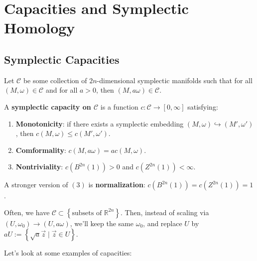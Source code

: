 \chapter{Capacities and Symplectic Homology}
\label{u2}

\section{Symplectic Capacities}

Let $\mathcal{C}$ be some collection of $2n$-dimensional symplectic manifolds such that for all $(M, \omega) \in \mathcal{C}$ and for all $a>0$, then $(M, a\omega) \in \mathcal{C}$.

\begin{definition}

A \textbf{symplectic capacity on $\mathcal{C}$} is a function $c: \mathcal{C}\to [0,\infty]$ satisfying:

\begin{enumerate}
\item \textbf{Monotonicity}: if there exists a symplectic embedding $(M, \omega) \hookrightarrow (M', \omega')$, then $c(M, \omega) \le c(M', \omega')$.
\item \textbf{Comformality}: $c(M, a\omega) = ac(M, \omega)$.
\item \textbf{Nontriviality}: $c(B^{2n}(1))>0$ and $c(Z^{2n}(1))<\infty$.
\end{enumerate}

\end{definition}

\begin{remark}

A stronger version of $(3)$ is \textbf{normalization}: $c(B^{2n}(1))=c(Z^{2n}(1)) =1$.

\end{remark}

Often, we have $\mathcal{C}\subset \left\{ \text{subsets of } \mathbb{R}^{2n} \right \}$. Then, instead of scaling via $(U, \omega_0)\to (U, a\omega)$, we'll keep the same $\omega_0$, and replace $U$ by $aU := \left\{ \sqrt{a}\vec{z} \mid  \vec{z} \in U \right\} $.

Let's look at some examples of capacities:

